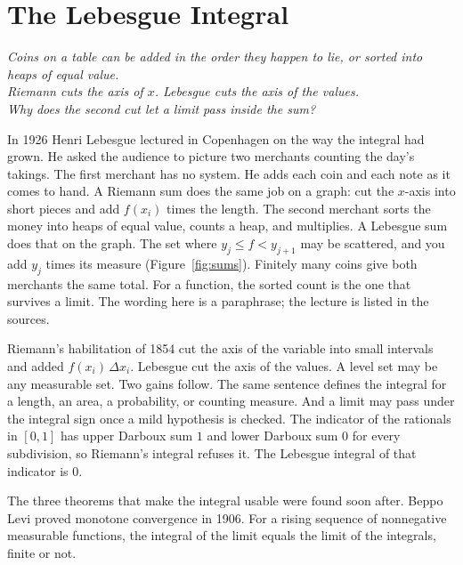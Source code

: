 \chapter{The Lebesgue Integral}\label{ch:integral}

\begin{center}\itshape
Coins on a table can be added in the order they happen to lie, or sorted into heaps of equal value.\\
Riemann cuts the axis of \(x\). Lebesgue cuts the axis of the values.\\
Why does the second cut let a limit pass inside the sum?
\end{center}

In 1926 Henri Lebesgue lectured in Copenhagen on the way the integral had grown. He asked the audience to picture two merchants counting the day's takings. The first merchant has no system. He adds each coin and each note as it comes to hand. A Riemann sum does the same job on a graph: cut the \(x\)-axis into short pieces and add \(f(x_i)\) times the length. The second merchant sorts the money into heaps of equal value, counts a heap, and multiplies. A Lebesgue sum does that on the graph. The set where \(y_j\le f<y_{j+1}\) may be scattered, and you add \(y_j\) times its measure (Figure~\ref{fig:sums}). Finitely many coins give both merchants the same total. For a function, the sorted count is the one that survives a limit. The wording here is a paraphrase; the lecture is listed in the sources.

Riemann's habilitation of 1854 cut the axis of the variable into small intervals and added \(f(x_i)\,\Delta x_i\). Lebesgue cut the axis of the values. A level set may be any measurable set. Two gains follow. The same sentence defines the integral for a length, an area, a probability, or counting measure. And a limit may pass under the integral sign once a mild hypothesis is checked. The indicator of the rationals in \([0,1]\) has upper Darboux sum \(1\) and lower Darboux sum \(0\) for every subdivision, so Riemann's integral refuses it. The Lebesgue integral of that indicator is \(0\).

The three theorems that make the integral usable were found soon after. Beppo Levi proved monotone convergence in 1906. For a rising sequence of nonnegative measurable functions, the integral of the limit equals the limit of the integrals, finite or not.



